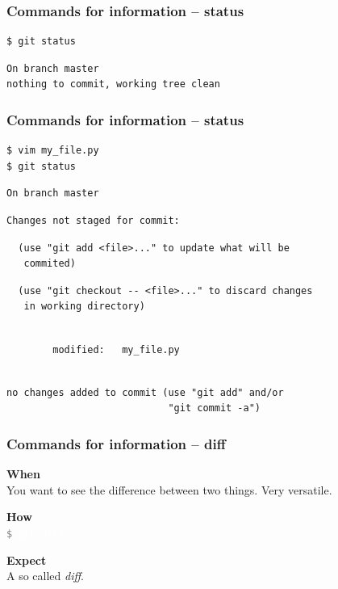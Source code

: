 \documentclass{beamer}
\newcommand{\keyword}[1]{\hspace{-1.0em}\textcolor{lkblue}{\textbf{#1}}\vspace{0.2em}} %
\newcommand{\command}[1]{\colorbox{black!78}{\vphantom{Ep}\texttt{\textcolor{gray}{\$}
\textcolor{white}{#1}}}}
\begin{document}
\begin{frame}[fragile]
  \frametitle{Commands for information -- status}

\begin{verbatim}
$ git status
\end{verbatim}
\pause{}
\begin{verbatim}
On branch master
nothing to commit, working tree clean
\end{verbatim}
\end{frame}

\begin{frame}[fragile]
  \frametitle{Commands for information -- status}

\begin{verbatim}
$ vim my_file.py
$ git status
\end{verbatim}
\pause{}
\vspace{-3.5ex}
\begin{verbatim}
On branch master
\end{verbatim}
\pause{}
\vspace{-3.5ex}
\begin{verbatim}
Changes not staged for commit:
\end{verbatim}
\pause{}
\vspace{-3.5ex}
\begin{verbatim}
  (use "git add <file>..." to update what will be
   commited)
\end{verbatim}
\pause{}
\vspace{-3.5ex}
\begin{verbatim}
  (use "git checkout -- <file>..." to discard changes
   in working directory)
\end{verbatim}
\pause{}
\vspace{-3.5ex}
\begin{verbatim}

        modified:   my_file.py
\end{verbatim}
\pause{}
\vspace{-3.5ex}
\begin{verbatim}

no changes added to commit (use "git add" and/or
                            "git commit -a")
\end{verbatim}
\end{frame}

\begin{frame}
  \frametitle{Commands for information -- diff}

  \keyword{When}\\
  You want to see the difference between two things. Very versatile.
  \vspace{0.5em}

  \keyword{How}\\
  \command{git diff}
  \vspace{0.5em}

  \keyword{Expect}\\
  A so called \emph{diff}.
\end{frame}
\end{document}
